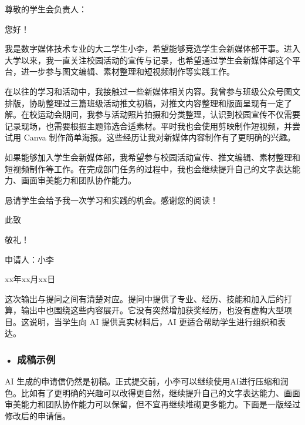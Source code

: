 \begin{aibox}
\noindent 尊敬的学生会负责人：

\par\qquad 您好！

\par\qquad 我是数字媒体技术专业的大二学生小李，希望能够竞选学生会新媒体部干事。进入大学以来，我一直关注校园活动的宣传与记录，也希望通过学生会新媒体部这个平台，进一步参与图文编辑、素材整理和短视频制作等实践工作。

\par\qquad 在以往的学习和活动中，我接触过一些新媒体相关内容。我曾参与班级公众号图文排版，协助整理过三篇班级活动推文初稿，对推文内容整理和版面呈现有一定了解。在校运动会期间，我参与活动照片拍摄和分类整理，认识到校园宣传不仅需要记录现场，也需要根据主题筛选合适素材。平时我也会使用剪映制作短视频，并尝试用 Canva 制作简单海报。这些经历让我对新媒体内容制作有了更明确的兴趣。

\par\qquad 如果能够加入学生会新媒体部，我希望参与校园活动宣传、推文编辑、素材整理和短视频制作等工作。在完成部门任务的过程中，我也会继续提升自己的文字表达能力、画面审美能力和团队协作能力。

\par\qquad 恳请学生会给予我一次学习和实践的机会。感谢您的阅读！

\par\qquad 此致

\noindent 敬礼！

\par\hfill 申请人：小李

\par\hfill xx年xx月xx日
\end{aibox}

这次输出与提问之间有清楚对应。提问中提供了专业、经历、技能和加入后的打算，输出中也围绕这些内容展开。它没有突然增加获奖经历，也没有虚构大型项目。这说明，当学生向 AI 提供真实材料后，AI 更适合帮助学生进行组织和表达。

\subsubsection*{\textbf{• 成稿示例}}

AI 生成的申请信仍然是初稿。正式提交前，小李可以继续使用AI进行压缩和润色。比如有了更明确的兴趣可以改得更自然，继续提升自己的文字表达能力、画面审美能力和团队协作能力可以保留，但不宜再继续堆砌更多能力。下面是一版经过修改后的申请信。

